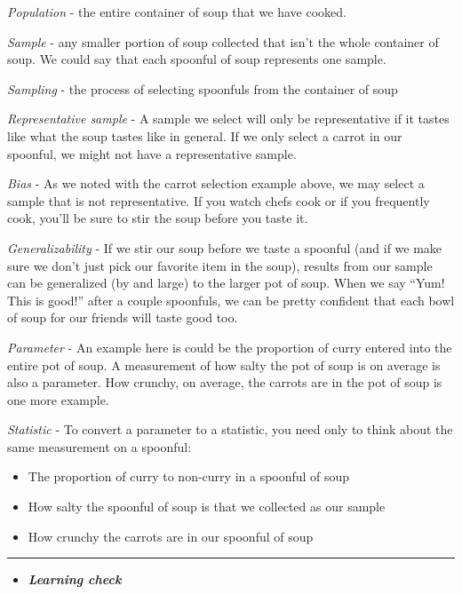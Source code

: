 \documentclass[]{tufte-book}
\providecommand{\tightlist}{%
  \setlength{\itemsep}{0pt}\setlength{\parskip}{0pt}}
\newenvironment{rmdblock}[1]
  {\begin{shaded*}
  \begin{itemize}
  \renewcommand{\labelitemi}{
    \raisebox{-.7\height}[0pt][0pt]{
    }
  }
  \item
  }
  {
  \end{itemize}
  \end{shaded*}
  }
\newenvironment{learncheck}
  {\begin{rmdblock}{warning}}
  {\end{rmdblock}}
\begin{document}
\emph{Population} - the entire container of soup that we have cooked.

\emph{Sample} - any smaller portion of soup collected that isn't the
whole container of soup. We could say that each spoonful of soup
represents one sample.

\emph{Sampling} - the process of selecting spoonfuls from the container
of soup

\emph{Representative sample} - A sample we select will only be
representative if it tastes like what the soup tastes like in general.
If we only select a carrot in our spoonful, we might not have a
representative sample.

\emph{Bias} - As we noted with the carrot selection example above, we
may select a sample that is not representative. If you watch chefs cook
or if you frequently cook, you'll be sure to stir the soup before you
taste it.

\emph{Generalizability} - If we stir our soup before we taste a spoonful
(and if we make sure we don't just pick our favorite item in the soup),
results from our sample can be generalized (by and large) to the larger
pot of soup. When we say ``Yum! This is good!'' after a couple
spoonfuls, we can be pretty confident that each bowl of soup for our
friends will taste good too.

\emph{Parameter} - An example here is could be the proportion of curry
entered into the entire pot of soup. A measurement of how salty the pot
of soup is on average is also a parameter. How crunchy, on average, the
carrots are in the pot of soup is one more example.

\emph{Statistic} - To convert a parameter to a statistic, you need only
to think about the same measurement on a spoonful:

\begin{itemize}
\tightlist
\item
  The proportion of curry to non-curry in a spoonful of soup
\item
  How salty the spoonful of soup is that we collected as our sample
\item
  How crunchy the carrots are in our spoonful of soup
\end{itemize}

\begin{center}\rule{\linewidth}{\linethickness}\end{center}\begin{learncheck}
\textbf{\emph{Learning check}}
\end{learncheck}
\end{document}

